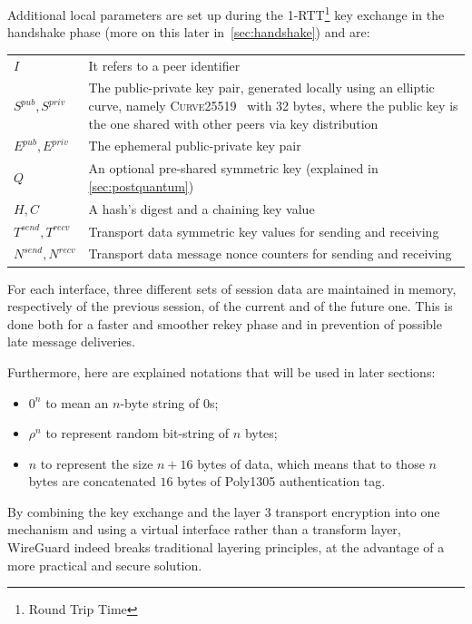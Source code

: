 \documentclass[light]{academica}
\begin{document}
\noindent
Additional local parameters are set up during the 1-RTT\footnote{Round Trip Time} key exchange in the handshake phase (more on this later in~\autoref{sec:handshake}) and are:
\begin{table}[H]
  \centering
  \begin{tabularx}{0.9\textwidth}{lX}
    $I$ & It refers to a peer identifier\\
    $S^{pub}, S^{priv}$ & The public-private key pair, generated locally using an elliptic curve, namely \textsc{Curve25519}~\cite{curve25519} with 32 bytes, where the public key is the one shared with other peers via key distribution\\
    $E^{pub}, E^{priv}$ & The ephemeral public-private key pair\\
    $Q$ & An optional pre-shared symmetric key (explained in \autoref{sec:postquantum})\\
    $H,C$ & A hash's digest and a chaining key value\\
    $T^{send}, T^{recv}$ & Transport data symmetric key values for sending and receiving\\
    $N^{send}, N^{recv}$ & Transport data message nonce counters for sending and receiving
  \end{tabularx}
\end{table}

For each interface, three different sets of session data are maintained in memory, respectively of the previous session, of the current and of the future one.
This is done both for a faster and smoother rekey phase and in prevention of possible late message deliveries.

Furthermore, here are explained notations that will be used in later sections:
\begin{itemize}
  \item $0^n$ to mean an $n$-byte string of $0$s;
  \item $\rho^n$ to represent random bit-string of $n$ bytes;
  \item $\widehat{n}$ to represent the size $n + 16$ bytes of data, which means that to those $n$ bytes are concatenated $16$ bytes of Poly1305 authentication tag.
\end{itemize}

\begin{note}
  By combining the key exchange and the layer 3 transport encryption into one mechanism and using a virtual interface rather than a transform layer, WireGuard indeed breaks traditional layering principles, at the advantage of a more practical and secure solution.
\end{note}
\end{document}
